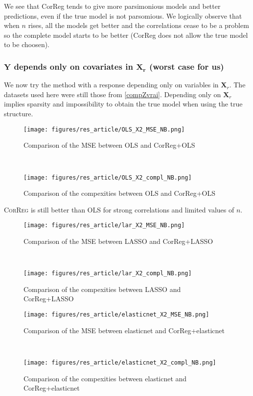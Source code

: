 \documentclass[11pt,a4paper]{report}
\begin{document}
We see that CorReg tends to give more parsimonious models and better predictions, even if the true model is not parsomious. We logically observe that when $n$ rises, all the models get better and the correlations cease to be a problem so the complete model starts to be better (CorReg does not allow the true model to be choosen).




\clearpage
	\subsubsection{$\boldsymbol{Y}$ depends only on covariates in $\boldsymbol{X_r}$ (worst case for us)}	 \label{tableMSEsimgauche}
We now try the method with a response depending only on variables in $\boldsymbol{X}_r$. The datasets used here were still those from \ref{compZvrai}.
Depending only on $\boldsymbol{X}_r$ implies sparsity and impossibility to obtain the true model when using the true structure. 

 \begin{figure}[h!]
	\begin{minipage}[l]{.48\linewidth}
			\texttt{[image: figures/res\_article/OLS\_X2\_MSE\_NB.png]} 
			\caption{Comparison of the MSE between OLS and CorReg+OLS}
	\end{minipage} \
   \begin{minipage}[r]{.48\linewidth}
			\texttt{[image: figures/res\_article/OLS\_X2\_compl\_NB.png]} 
			\caption{Comparison of the compexities between OLS and CorReg+OLS} 
   \end{minipage}
\end{figure}
\textsc{CorReg} is still better than OLS for strong correlations and limited values of $n$. 
 \begin{figure}[h!]
	\begin{minipage}[l]{.48\linewidth}
			\texttt{[image: figures/res\_article/lar\_X2\_MSE\_NB.png]} 
			\caption{Comparison of the MSE between LASSO and CorReg+LASSO}
	\end{minipage} \
   \begin{minipage}[r]{.48\linewidth}
			\texttt{[image: figures/res\_article/lar\_X2\_compl\_NB.png]} 
			\caption{Comparison of the compexities between LASSO and CorReg+LASSO} 
   \end{minipage}
\end{figure}

 \begin{figure}[h!]
	\begin{minipage}[l]{.48\linewidth}
			\texttt{[image: figures/res\_article/elasticnet\_X2\_MSE\_NB.png]} 
			\caption{Comparison of the MSE between elasticnet and CorReg+elasticnet}
	\end{minipage} \
   \begin{minipage}[r]{.48\linewidth}
			\texttt{[image: figures/res\_article/elasticnet\_X2\_compl\_NB.png]} 
			\caption{Comparison of the compexities between elasticnet and CorReg+elasticnet} 
   \end{minipage}
\end{figure}
\end{document}

